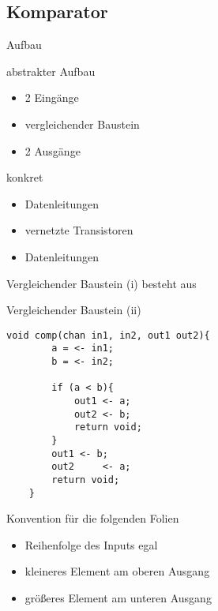 \documentclass[ucs,9pt]{beamer}
\begin{document}
\subsection{Komparator}
\begin{frame}{Aufbau}
\begin{minipage}[c]{5cm}
abstrakter Aufbau
\begin{itemize}
\item 2 Eingänge
\item vergleichender Baustein
\item 2 Ausgänge
\end{itemize}
\end{minipage}
\hfill
\pause
\begin{minipage}[c]{5cm}
konkret
\begin{itemize}
\item Datenleitungen
\item vernetzte Transistoren
\item Datenleitungen
\end{itemize}
\end{minipage}
\end{frame}
\begin{frame}{Vergleichender Baustein (i)}
besteht aus
\end{frame}
\begin{frame}[fragile]{Vergleichender Baustein (ii)}
\begin{lstlisting}[laguage={inform},tabsize=4]
    void comp(chan in1, in2, out1 out2){
        a = <- in1;
        b = <- in2;
        
        if (a < b){
            out1 <- a;
            out2 <- b;
            return void;
        }
        out1 <- b;
        out2	 <- a;
        return void;
    }
\end{lstlisting}
\end{frame}
\begin{frame}
Konvention für die folgenden Folien
\begin{itemize}
\item Reihenfolge des Inputs egal
\item kleineres Element am oberen Ausgang
\item größeres Element am unteren Ausgang
\end{itemize}
\end{frame}
\end{document}
